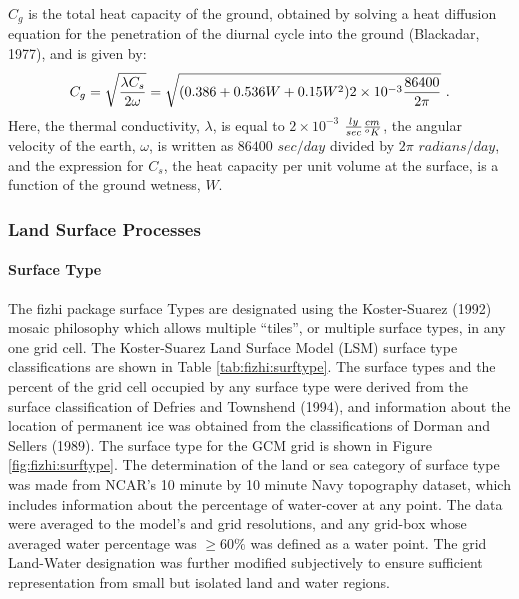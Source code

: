 $C_g$ is the total heat capacity of the ground, obtained by solving a heat diffusion equation
for the penetration of the diurnal cycle into the ground (Blackadar, 1977), and is given by:
\[
C_g = \sqrt{ {\lambda C_s \over 2\omega} } = \sqrt{(0.386 + 0.536W + 0.15W^2)2\times10^{-3}
{86400 \over 2 \pi} } \, \, .
\]
Here, the thermal conductivity, $\lambda$, is equal to $2\times10^{-3}$ ${ly\over{ sec}}
{cm \over {^oK}}$,    
the angular velocity of the earth, $\omega$, is written as $86400$ $sec/day$ divided
by $2 \pi$ $radians/  
day$, and the expression for $C_s$, the heat capacity per unit volume at the surface,
is a function of the ground wetness, $W$.

\subsubsection{Land Surface Processes}

\paragraph{Surface Type}
The fizhi package surface Types are designated using the Koster-Suarez (1992) mosaic
philosophy which allows multiple ``tiles'', or multiple surface types, in any one
grid cell. The Koster-Suarez Land Surface Model (LSM) surface type classifications
are shown in Table \ref{tab:fizhi:surftype}. The surface types and the percent of the grid
cell occupied by any surface type were derived from the surface classification of
Defries and Townshend (1994), and information about the location of permanent
ice was obtained from the classifications of Dorman and Sellers (1989).
The surface type for the \txt GCM grid is shown in Figure \ref{fig:fizhi:surftype}.
The determination of the land or sea category of surface type was made from NCAR's
10 minute by 10 minute Navy topography 
dataset, which includes information about the percentage of water-cover at any point.
The data were averaged to the model's \fxf and \txt grid resolutions,
and any grid-box whose averaged water percentage was $\geq 60 \%$ was
defined as a water point. The \fxf grid Land-Water designation was further modified
subjectively to ensure sufficient representation from small but isolated land and water regions.
 
